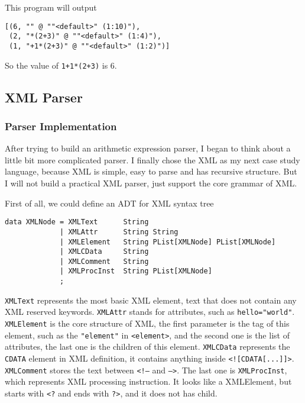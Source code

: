 This program will output

\begin{lstlisting}
[(6, "" @ ""<default>" (1:10)"),
 (2, "*(2+3)" @ ""<default>" (1:4)"),
 (1, "+1*(2+3)" @ ""<default>" (1:2)")]
\end{lstlisting}

So the value of \texttt{1+1*(2+3)} is 6.

\subsection{XML Parser}

\subsubsection{Parser Implementation}

After trying to build an arithmetic expression parser, I began to think about a little bit more complicated parser. I finally chose the XML as my next case study language, because XML is simple, easy to parse and has recursive structure. But I will not build a practical XML parser, just support the core grammar of XML.

First of all, we could define an ADT for XML syntax tree

\begin{lstlisting}
data XMLNode = XMLText      String
             | XMLAttr      String String
             | XMLElement   String PList[XMLNode] PList[XMLNode]
             | XMLCData     String
             | XMLComment   String
             | XMLProcInst  String PList[XMLNode]
             ;
\end{lstlisting}

\texttt{XMLText} represents the most basic XML element, text that does not contain any XML reserved keywords. \texttt{XMLAttr} stands for attributes, such as \texttt{hello="world"}. \texttt{XMLElement} is the core structure of XML, the first parameter is the tag of this element, such as the \texttt{"element"} in \texttt{<element>}, and the second one is the list of attributes, the last one is the children of this element. \texttt{XMLCData} represents the \texttt{CDATA} element in XML definition, it contains anything inside \texttt{<![CDATA[...]]>}. \texttt{XMLComment} stores the text between \texttt{<!--} and \texttt{-->}. The last one is \texttt{XMLProcInst}, which represents XML processing instruction. It looks like a XMLElement, but starts with \texttt{<?} and ends with \texttt{?>}, and it does not has child.

